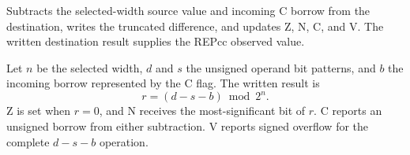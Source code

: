 Subtracts the selected-width source value and incoming C borrow from the destination, writes the truncated difference, and updates Z, N, C, and V. The written destination result supplies the REPcc observed value.

Let \(n\) be the selected width, \(d\) and \(s\) the unsigned operand bit patterns, and \(b\) the incoming borrow represented by the C flag. The written result is
\[
  r = (d - s - b) \bmod 2^n .
\]
Z is set when \(r=0\), and N receives the most-significant bit of \(r\). C reports an unsigned borrow from either subtraction. V reports signed overflow for the complete \(d-s-b\) operation.
